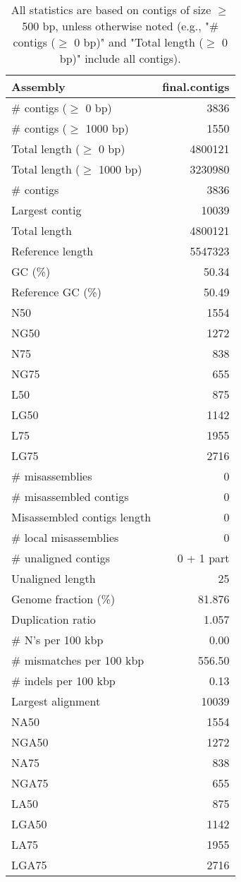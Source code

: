 \documentclass[12pt,a4paper]{article}
\begin{document}
\begin{table}[ht]
\begin{center}
\caption{All statistics are based on contigs of size $\geq$ 500 bp, unless otherwise noted (e.g., "\# contigs ($\geq$ 0 bp)" and "Total length ($\geq$ 0 bp)" include all contigs).}
\begin{tabular}{|l*{1}{|r}|}
\hline
Assembly & final.contigs \\ \hline
\# contigs ($\geq$ 0 bp) & 3836 \\ \hline
\# contigs ($\geq$ 1000 bp) & 1550 \\ \hline
Total length ($\geq$ 0 bp) & 4800121 \\ \hline
Total length ($\geq$ 1000 bp) & 3230980 \\ \hline
\# contigs & 3836 \\ \hline
Largest contig & 10039 \\ \hline
Total length & 4800121 \\ \hline
Reference length & 5547323 \\ \hline
GC (\%) & 50.34 \\ \hline
Reference GC (\%) & 50.49 \\ \hline
N50 & 1554 \\ \hline
NG50 & 1272 \\ \hline
N75 & 838 \\ \hline
NG75 & 655 \\ \hline
L50 & 875 \\ \hline
LG50 & 1142 \\ \hline
L75 & 1955 \\ \hline
LG75 & 2716 \\ \hline
\# misassemblies & 0 \\ \hline
\# misassembled contigs & 0 \\ \hline
Misassembled contigs length & 0 \\ \hline
\# local misassemblies & 0 \\ \hline
\# unaligned contigs & 0 + 1 part \\ \hline
Unaligned length & 25 \\ \hline
Genome fraction (\%) & 81.876 \\ \hline
Duplication ratio & 1.057 \\ \hline
\# N's per 100 kbp & 0.00 \\ \hline
\# mismatches per 100 kbp & 556.50 \\ \hline
\# indels per 100 kbp & 0.13 \\ \hline
Largest alignment & 10039 \\ \hline
NA50 & 1554 \\ \hline
NGA50 & 1272 \\ \hline
NA75 & 838 \\ \hline
NGA75 & 655 \\ \hline
LA50 & 875 \\ \hline
LGA50 & 1142 \\ \hline
LA75 & 1955 \\ \hline
LGA75 & 2716 \\ \hline
\end{tabular}
\end{center}
\end{table}
\end{document}
